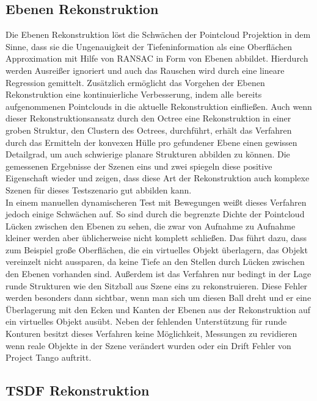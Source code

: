 \subsection*{Ebenen Rekonstruktion}

Die Ebenen Rekonstruktion löst die Schwächen der Pointcloud Projektion in dem Sinne, dass sie die Ungenauigkeit der Tiefeninformation als eine Oberflächen Approximation mit Hilfe von RANSAC in Form von Ebenen abbildet. Hierdurch werden Ausreißer ignoriert und auch das Rauschen wird durch eine lineare Regression gemittelt. Zusätzlich ermöglicht das Vorgehen der Ebenen Rekonstruktion eine kontinuierliche Verbesserung, indem alle bereits aufgenommenen Pointclouds in die aktuelle Rekonstruktion einfließen. Auch wenn dieser Rekonstruktionsansatz durch den Octree eine Rekonstruktion in einer groben Struktur, den Clustern des Octrees, durchführt, erhält das Verfahren durch das Ermitteln der konvexen Hülle pro gefundener Ebene einen gewissen Detailgrad, um auch schwierige planare Strukturen abbilden zu können. Die gemessenen Ergebnisse der Szenen eins und zwei spiegeln diese positive Eigenschaft wieder und zeigen, dass diese Art der Rekonstruktion auch komplexe Szenen für dieses Testszenario gut abbilden kann.\\

In einem manuellen dynamischeren Test mit Bewegungen weißt dieses Verfahren jedoch einige Schwächen auf. So sind durch die begrenzte Dichte der Pointcloud Lücken zwischen den Ebenen zu sehen, die zwar von Aufnahme zu Aufnahme kleiner werden aber üblicherweise nicht komplett schließen. Das führt dazu, dass zum Beispiel große Oberflächen, die ein virtuelles Objekt überlagern, das Objekt vereinzelt nicht aussparen, da keine Tiefe an den Stellen durch Lücken zwischen den Ebenen vorhanden sind. Außerdem ist das Verfahren nur bedingt in der Lage runde Strukturen wie den Sitzball aus Szene eins zu rekonstruieren. Diese Fehler werden besonders dann sichtbar, wenn man sich um diesen Ball dreht und er eine Überlagerung mit den Ecken und Kanten der Ebenen aus der Rekonstruktion auf ein virtuelles Objekt ausübt. Neben der fehlenden Unterstützung für runde Konturen besitzt dieses Verfahren keine Möglichkeit, Messungen zu revidieren wenn reale Objekte in der Szene verändert wurden oder ein Drift Fehler von Project Tango auftritt.

\subsection*{TSDF Rekonstruktion}

